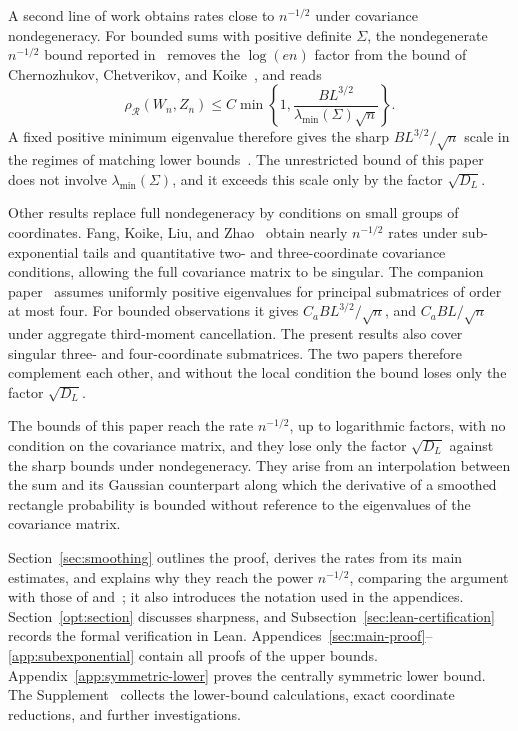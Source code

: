 \documentclass[11pt,letterpaper]{article}
\theoremstyle{remark}
\newcommand{\rh}{\rho_{\mathcal R}}
\begin{document}
A second line of work obtains rates close to \(n^{-1/2}\) under
covariance nondegeneracy. For bounded sums with positive definite
\(\Sigma\), the nondegenerate \(n^{-1/2}\) bound reported in~\cite[Theorem~1.1]{AL} removes the
\(\log(en)\) factor from the bound of Chernozhukov, Chetverikov,
and Koike~\cite[Corollary~2.1]{CCK}, and reads
\begin{equation*}
 \rh(W_n,Z_n)\le C\min\left\{1,
 \frac{BL^{3/2}}{\lambda_{\min}(\Sigma)\sqrt n}\right\}.
\end{equation*}
A fixed positive minimum eigenvalue therefore gives the sharp
\(BL^{3/2}/\sqrt n\) scale in the regimes of matching lower
bounds~\cite[Proposition~2.1]{CCK}.
The unrestricted bound of this paper does not involve \(\lambda_{\min}(\Sigma)\),
and it exceeds this scale only by the factor \(\sqrt{D_L}\).

Other results replace full nondegeneracy by conditions on small
groups of coordinates. Fang, Koike, Liu, and Zhao~\cite[Theorem~1.1]{FKLZ} obtain nearly
\(n^{-1/2}\) rates under sub-exponential tails and quantitative
two- and three-coordinate covariance conditions, allowing the full
covariance matrix to be singular. The companion paper~\cite{Local}
assumes uniformly positive eigenvalues for principal submatrices of
order at most four. For bounded observations it gives
\(C_aBL^{3/2}/\sqrt n\), and \(C_aBL/\sqrt n\) under aggregate
third-moment cancellation. The present results also cover singular
three- and four-coordinate submatrices. The two papers therefore
complement each other, and without the local condition the bound loses
only the factor \(\sqrt{D_L}\).

The bounds of this paper reach the rate \(n^{-1/2}\), up to logarithmic factors, with
no condition on the covariance matrix, and they lose only the factor
\(\sqrt{D_L}\) against the sharp bounds under nondegeneracy. They arise
from an interpolation between the sum and its Gaussian counterpart along
which the derivative of a smoothed rectangle probability is bounded
without reference to the eigenvalues of the covariance matrix.

Section~\ref{sec:smoothing} outlines the proof, derives
the rates from its main estimates, and explains why they reach the
power \(n^{-1/2}\), comparing the argument with those of \cite{AL} and~\cite{GaoZhang}; it also introduces the
notation used in the appendices. Section~\ref{opt:section}
discusses sharpness, and Subsection~\ref{sec:lean-certification}
records the formal verification in Lean.
Appendices~\ref{sec:main-proof}--\ref{app:subexponential}
contain all proofs of the upper bounds. Appendix~\ref{app:symmetric-lower}
proves the centrally symmetric lower bound. The Supplement~\cite{Supplement} collects the lower-bound calculations,
exact coordinate reductions, and further investigations.
\end{document}
